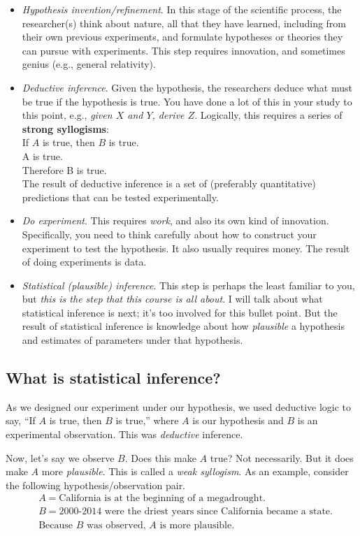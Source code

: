 \begin{itemize}
\item \textit{Hypothesis invention/refinement}.  In this stage of the
  scientific process, the researcher(s) think about nature, all that
  they have learned, including from their own previous experiments,
  and formulate hypotheses or theories they can pursue with
  experiments.  This step requires innovation, and sometimes genius
  (e.g., general relativity).
\item \textit{Deductive inference}. Given the hypothesis, the
  researchers deduce what must be true if the hypothesis is true.  You
  have done a lot of this in your study to this point, e.g.,
  \textit{given $X$ and $Y$, derive $Z$}.  Logically, this requires a
  series of \textbf{strong syllogisms}:\\
  \phantom{blahblah}If $A$ is true, then $B$ is true.\\
  \phantom{blahblah}A is true.\\
  \phantom{blahblah}Therefore B is true.\\
  The result of deductive inference is a set of (preferably
  quantitative) predictions that can be tested experimentally.
\item \textit{Do experiment}. This requires \textit{work}, and also
  its own kind of innovation.  Specifically, you need to think
  carefully about how to construct your experiment to test the
  hypothesis. It also usually requires money.  The result of doing
  experiments is data.  
\item \textit{Statistical (plausible) inference}. This step is perhaps
  the least familiar to you, but \textit{this is the step that this
    course is all about}.  I will talk about what statistical
  inference is next; it's too involved for this bullet point.  But the
  result of statistical inference is knowledge about how
  \textit{plausible} a hypothesis and estimates of parameters under
  that hypothesis.
\end{itemize}


\subsection{What is statistical inference?}
As we designed our experiment under our hypothesis, we used deductive
logic to say, ``If $A$ is true, then $B$ is true,'' where $A$ is our
hypothesis and $B$ is an experimental observation.  This was
\textit{deductive} inference.

Now, let's say we observe $B$.  Does this make $A$ true?  Not
necessarily.  But it does make $A$ more \textit{plausible}.  This is
called a \textit{weak syllogism}.  As an example, consider the
following hypothesis/observation pair.
\begin{align*}
&A = \text{California is at the beginning of a megadrought.}\\
&B = \text{2000-2014 were the driest years since California became a state.}\\
&\text{Because } B \text{ was observed, } A \text{ is more plausible.}
\end{align*}


